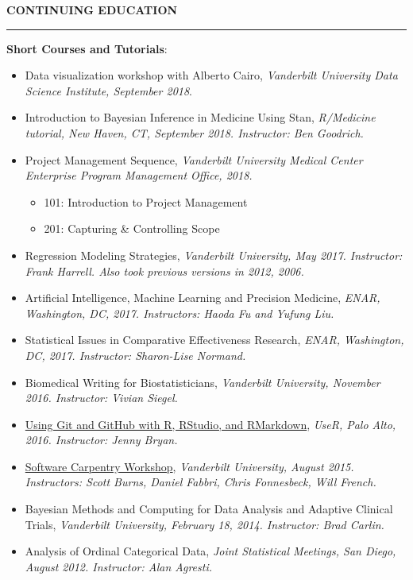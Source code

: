 \documentclass[5pt]{article}
\begin{document}
\pagebreak
\noindent \linebreak \textbf{CONTINUING EDUCATION}\\
\rule[5pt]{\linewidth}{1.0pt}
\noindent \textbf{Short Courses and Tutorials}:
\begin{itemize}
\item Data visualization workshop with Alberto Cairo, \emph{Vanderbilt University Data Science Institute, September 2018}.
\item Introduction to Bayesian Inference in Medicine Using Stan, \emph{R/Medicine tutorial, New Haven, CT, September 2018. Instructor: Ben Goodrich.}
\item Project Management Sequence, \emph{Vanderbilt University Medical Center Enterprise Program Management Office, 2018.}
  \begin{itemize}
  \item 101: Introduction to Project Management
  \item 201: Capturing \& Controlling Scope
  \end{itemize}
\item Regression Modeling Strategies, \emph{Vanderbilt University, May 2017. Instructor: Frank Harrell. Also took previous versions in 2012, 2006.}
\item Artificial Intelligence, Machine Learning and Precision Medicine, \emph{ENAR, Washington, DC, 2017. Instructors: Haoda Fu and Yufung Liu.}
\item Statistical Issues in Comparative Effectiveness Research, \emph{ENAR, Washington, DC, 2017. Instructor: Sharon-Lise Normand.}
\item Biomedical Writing for Biostatisticians, \emph{Vanderbilt University, November 2016. Instructor: Vivian Siegel.}
\item \href{http://user2016.org/tutorials/01.html}{Using Git and GitHub with R, RStudio, and RMarkdown}, \emph{UseR, Palo Alto, 2016. Instructor: Jenny Bryan.}
\item \href{https://software-carpentry.org/workshops/}{Software Carpentry Workshop}, \emph{Vanderbilt University, August 2015. Instructors: Scott Burns, Daniel Fabbri, Chris Fonnesbeck, Will French.}
\item Bayesian Methods and Computing for Data Analysis and Adaptive Clinical Trials, \emph{Vanderbilt University, February 18, 2014. Instructor: Brad Carlin.}
\item Analysis of Ordinal Categorical Data, \emph{Joint Statistical Meetings, San Diego, August 2012. Instructor: Alan Agresti.}

\end{itemize}
\end{document}
